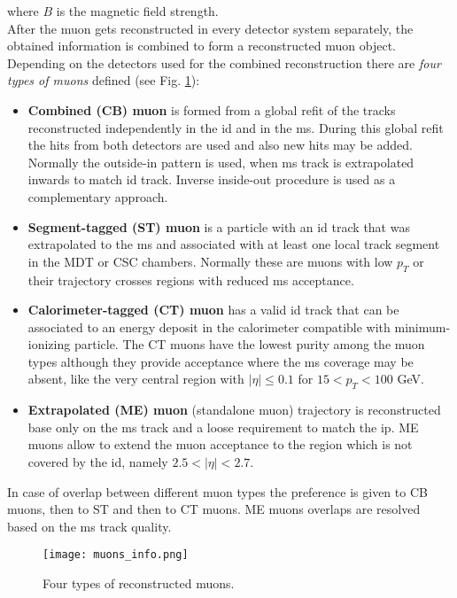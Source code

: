     where $B$ is the magnetic field strength.\\    
    After the muon gets reconstructed in every detector system separately, the obtained information is combined to form a reconstructed muon object. Depending on the detectors used for the combined reconstruction there are \textit{four types of muons} defined (see Fig. \ref{fig::muon_combined}):
    \begin{itemize}
	\item \textbf{Combined (CB) muon} is formed from a global refit of the tracks reconstructed independently in the \gls{id} and in the \gls{ms}. During this global refit the hits from both detectors are used and also new hits may be added. Normally the outside-in pattern is used, when \gls{ms} track is extrapolated inwards to match \gls{id} track. Inverse inside-out procedure is used as a complementary approach.
	\item \textbf{Segment-tagged (ST) muon} is a particle with an \gls{id} track that was extrapolated to the \gls{ms} and associated with at least one local track segment in the MDT or CSC chambers. Normally these are muons with low $p_T$ or their trajectory crosses regions with reduced \gls{ms} acceptance.
	\item \textbf{Calorimeter-tagged (CT) muon} has a valid \gls{id} track that can be associated to an energy deposit in the calorimeter compatible with minimum-ionizing particle. The CT muons have the lowest purity among the muon types although they provide acceptance where the \gls{ms} coverage may be absent, like the very central region with $|\eta| \le 0.1$ for $15<p_T<100$ GeV. 
	\item \textbf{Extrapolated (ME) muon} (standalone muon) trajectory is reconstructed base only on the \gls{ms} track and a loose requirement to match the \gls{ip}. ME muons allow to extend the muon acceptance to the region which is not covered by the \gls{id}, namely $2.5<|\eta| < 2.7$.
	\end{itemize}
	In case of overlap between different muon types the preference is given to CB muons, then to ST and then to CT muons. ME muons overlaps are resolved based on the \gls{ms} track quality.
      \begin{figure}[htbp]
	\centering
	\texttt{[image: muons\_info.png]}
	\caption[muon combined]{Four types of reconstructed muons.}
	\label{fig::muon_combined}
	\end{figure}
